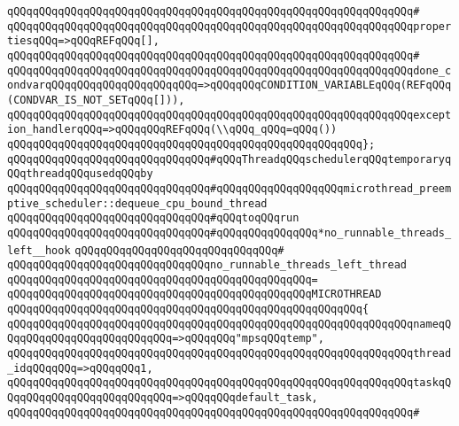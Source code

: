\verb|qQQqqQQqqQQqqQQqqQQqqQQqqQQqqQQqqQQqqQQqqQQqqQQqqQQqqQQqqQQqqQQq#|\newline
\verb|qQQqqQQqqQQqqQQqqQQqqQQqqQQqqQQqqQQqqQQqqQQqqQQqqQQqqQQqqQQqqQQqpropertiesqQQq=>qQQqREFqQQq[],|\newline
\verb|qQQqqQQqqQQqqQQqqQQqqQQqqQQqqQQqqQQqqQQqqQQqqQQqqQQqqQQqqQQqqQQq#|\newline
\verb|qQQqqQQqqQQqqQQqqQQqqQQqqQQqqQQqqQQqqQQqqQQqqQQqqQQqqQQqqQQqqQQqdone_condvarqQQqqQQqqQQqqQQqqQQqqQQq=>qQQqqQQqCONDITION_VARIABLEqQQq(REFqQQq(CONDVAR_IS_NOT_SETqQQq[])),|\newline
\verb|qQQqqQQqqQQqqQQqqQQqqQQqqQQqqQQqqQQqqQQqqQQqqQQqqQQqqQQqqQQqqQQqexception_handlerqQQq=>qQQqqQQqREFqQQq(\\qQQq_qQQq=qQQq())|\newline
\verb|qQQqqQQqqQQqqQQqqQQqqQQqqQQqqQQqqQQqqQQqqQQqqQQqqQQqqQQq};|\newline
\newline
\verb|qQQqqQQqqQQqqQQqqQQqqQQqqQQqqQQq#qQQqThreadqQQqschedulerqQQqtemporaryqQQqthreadqQQqusedqQQqby|\newline
\verb|qQQqqQQqqQQqqQQqqQQqqQQqqQQqqQQq#qQQqqQQqqQQqqQQqqQQqmicrothread_preemptive_scheduler::dequeue_cpu_bound_thread|\newline
\verb|qQQqqQQqqQQqqQQqqQQqqQQqqQQqqQQq#qQQqtoqQQqrun|\newline
\verb|qQQqqQQqqQQqqQQqqQQqqQQqqQQqqQQq#qQQqqQQqqQQqqQQq*no_runnable_threads_left__hook|\newline
\verb|qQQqqQQqqQQqqQQqqQQqqQQqqQQqqQQq#|\newline
\verb|qQQqqQQqqQQqqQQqqQQqqQQqqQQqqQQqno_runnable_threads_left_thread|\newline
\verb|qQQqqQQqqQQqqQQqqQQqqQQqqQQqqQQqqQQqqQQqqQQqqQQq=|\newline
\verb|qQQqqQQqqQQqqQQqqQQqqQQqqQQqqQQqqQQqqQQqqQQqqQQqMICROTHREAD|\newline
\verb|qQQqqQQqqQQqqQQqqQQqqQQqqQQqqQQqqQQqqQQqqQQqqQQqqQQqqQQq{|\newline
\verb|qQQqqQQqqQQqqQQqqQQqqQQqqQQqqQQqqQQqqQQqqQQqqQQqqQQqqQQqqQQqqQQqnameqQQqqQQqqQQqqQQqqQQqqQQqqQQq=>qQQqqQQq"mpsqQQqtemp",|\newline
\verb|qQQqqQQqqQQqqQQqqQQqqQQqqQQqqQQqqQQqqQQqqQQqqQQqqQQqqQQqqQQqqQQqthread_idqQQqqQQq=>qQQqqQQq1,|\newline
\verb|qQQqqQQqqQQqqQQqqQQqqQQqqQQqqQQqqQQqqQQqqQQqqQQqqQQqqQQqqQQqqQQqtaskqQQqqQQqqQQqqQQqqQQqqQQqqQQq=>qQQqqQQqdefault_task,|\newline
\verb|qQQqqQQqqQQqqQQqqQQqqQQqqQQqqQQqqQQqqQQqqQQqqQQqqQQqqQQqqQQqqQQq#|\newline

